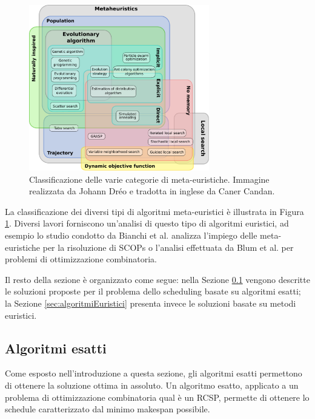 \begin{figure}
 \begin{center}
  \includegraphics[width=0.7\textwidth]
  {capitoli/figure/cap2/MetaheuristicsClassification.pdf}
  \caption{Classificazione delle varie categorie di meta-euristiche. Immagine 
realizzata da Johann Dréo e tradotta in inglese da Caner Candan.}
\label{fig:metaheuristicsClassification}
 \end{center}
\end{figure}


La classificazione dei diversi tipi di algoritmi meta-euristici è illustrata in 
Figura \ref{fig:metaheuristicsClassification}. Diversi lavori forniscono 
un'analisi di questo tipo di algoritmi euristici, ad esempio lo studio condotto 
da Bianchi et al. \cite{SurveyMetaheuristicSCOP} analizza l'impiego delle 
meta-euristiche per la risoluzione di \acp{SCOP} o l'analisi effettuata da Blum 
et al. \cite{MetaheuristicCombinatorialOptimization} per problemi di 
ottimizzazione combinatoria.

Il resto della sezione è organizzato come segue: nella Sezione 
\ref{sec:algoritmiEsatti} vengono descritte le soluzioni proposte per il 
problema dello scheduling basate su algoritmi esatti; la Sezione 
\ref{sec:algoritmiEuristici} presenta invece le soluzioni basate su metodi 
euristici.


\subsection{Algoritmi esatti}
\label{sec:algoritmiEsatti}
Come esposto nell'introduzione a questa sezione, gli algoritmi esatti 
permettono di ottenere la soluzione ottima in assoluto. Un algoritmo esatto, 
applicato a un problema di ottimizzazione combinatoria qual è un \ac{RCSP}, 
permette di ottenere lo schedule caratterizzato dal minimo makespan possibile. 

